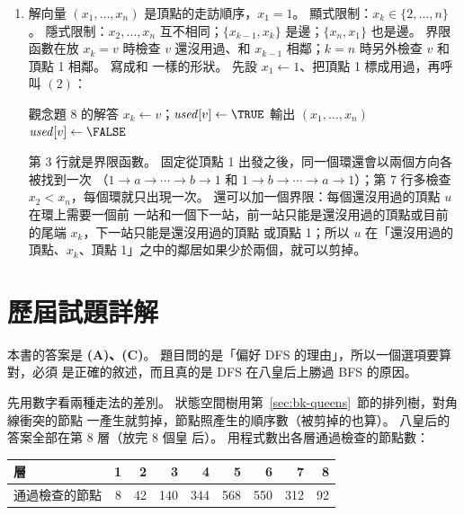 \begin{enumerate}
\item 解向量 $(x_1, \ldots, x_n)$ 是頂點的走訪順序，$x_1 = 1$。 顯式限制：$x_k \in \{2, \ldots,
n\}$。 隱式限制：$x_2, \ldots, x_n$ 互不相同；$\{x_{k-1}, x_k\}$ 是邊；$\{x_n, x_1\}$ 也是邊。
界限函數在放 $x_k = v$ 時檢查 $v$ 還沒用過、和 $x_{k-1}$ 相鄰；$k = n$ 時另外檢查 $v$ 和頂點
1 相鄰。
寫成和  一樣的形狀。 先設 $x_1 \gets 1$、把頂點 1 標成用過，再呼叫
$(2)$：
\begin{pseudo}[unbreakable]{觀念題 8 的解答}
            \State $x_k \gets v$；$\mathit{used}[v] \gets \TRUE$
                \State {}
                \State 輸出 $(x_1, \ldots, x_n)$
            \EndIf
            \State $\mathit{used}[v] \gets \FALSE$ 
        \EndIf
    \EndFor
\EndProcedure
\end{pseudo}
第 3 行就是界限函數。 固定從頂點 1 出發之後，同一個環還會以兩個方向各被找到一次
（$1 \to a \to \cdots \to b \to 1$ 和 $1 \to b \to \cdots \to a \to 1$）；第 7 行多檢查
$x_2 < x_n$，每個環就只出現一次。 還可以加一個界限：每個還沒用過的頂點 $u$ 在環上需要一個前
一站和一個下一站，前一站只能是還沒用過的頂點或目前的尾端 $x_k$，下一站只能是還沒用過的頂點
或頂點 1；所以 $u$ 在「還沒用過的頂點、$x_k$、頂點 1」之中的鄰居如果少於兩個，就可以剪掉。
\end{enumerate}

\section*{歷屆試題詳解}

本書的答案是 \textbf{(A)、(C)}。 題目問的是「偏好 DFS 的理由」，所以一個選項要算對，必須
是正確的敘述，而且真的是 DFS 在八皇后上勝過 BFS 的原因。

先用數字看兩種走法的差別。 狀態空間樹用第~\ref{sec:bk-queens}~節的排列樹，對角線衝突的節點
一產生就剪掉，節點照產生的順序數（被剪掉的也算）。 八皇后的答案全部在第 $8$ 層（放完 $8$ 個皇
后）。 用程式數出各層通過檢查的節點數：

\begin{center}
\begin{tabular}{l*{8}{r}}
\toprule
層 & 1 & 2 & 3 & 4 & 5 & 6 & 7 & 8 \\
\midrule
通過檢查的節點 & 8 & 42 & 140 & 344 & 568 & 550 & 312 & 92 \\
\bottomrule
\end{tabular}
\end{center}

